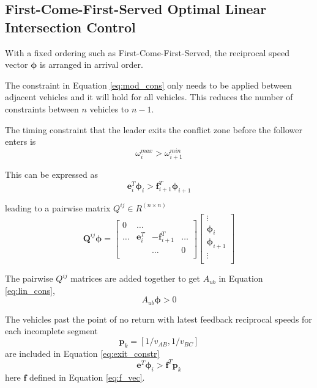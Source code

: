 \subsection{First-Come-First-Served Optimal Linear Intersection Control}
With a fixed ordering such as First-Come-First-Served, the reciprocal speed vector $\bm{\phi}$ is arranged in arrival order. 

The constraint in Equation \ref{eq:mod_cons} only needs to be applied between adjacent vehicles and it will hold for all vehicles. This reduces the number of constraints between $n$ vehicles to $n-1$.

The timing constraint that the leader exits the conflict zone before the follower enters is 
\begin{equation}
	\omega_i^{max} > \omega_{i+1}^{min}
\end{equation}

This can be expressed as 
\begin{equation}
	\bm{e}_i^T\bm{\phi}_i > \bm{f}_{i+1}^T\bm{\phi}_{i+1}
\end{equation}

leading to a pairwise matrix $Q^{ij} \in R^{(n \times n)}$
\begin{equation}
	\bm{Q}^{ij}\bm{\phi} = \left[ \begin{array}{cccc}
		0 & \hdots &&\\
		\hdots & \bm{e}_i^T & -\bm{f}_{i+1}^T & \hdots \\
		&&\hdots & 0\\
	\end{array} \right]
	\left[ \begin{array}{c}
		\vdots\\
		\bm{\phi}_i \\
		\bm{\phi}_{i+1} \\
		\vdots\\
	\end{array} \right]
\end{equation}

The pairwise $Q^{ij}$ matrices are added together to get $A_{ub}$ in Equation \ref{eq:lin_cons}, 
\begin{equation}
	\label{eq:lin_cons}
	A_{ub}\bm{\phi} > 0
\end{equation}

The vehicles past the point of no return with latest feedback reciprocal speeds for each incomplete segment
\begin{equation}
	\bm{p}_k  = [1/v_{AB}, 1/v_{BC}]
\end{equation}
are included in Equation \ref{eq:exit_constr} 
\begin{equation}
	\bm{e}^T\bm{\phi}_i >  \bm{f}^T\bm{p}_k
	\label{eq:exit_constr}
\end{equation} 
here $\bm{f}$ defined in Equation \ref{eq:f_vec}.


